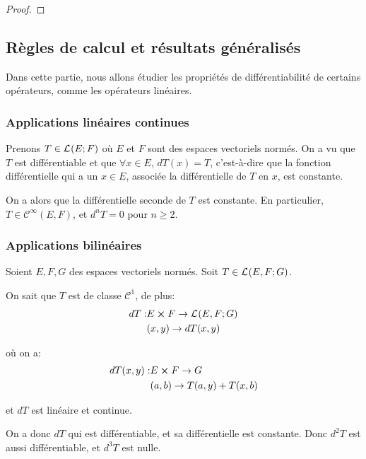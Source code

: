 \ifdefined\outputproof
\begin{proof}

\end{proof}
\fi

\subsection{Règles de calcul et résultats généralisés}

Dans cette partie, nous allons étudier les propriétés de différentiabilité de
certains opérateurs, comme les opérateurs linéaires.

\subsubsection{Applications linéaires continues}

Prenons $T \in \mathcal{L}_{}(E; F)$ où $E$ et $F$ sont des espaces vectoriels
normés.
On a vu que $T$ est différentiable et que $\forall x \in E$, $dT(x) = T$,
c'est-à-dire que la fonction différentielle qui a un $x \in E$, associée la
différentielle de $T$ en $x$, est constante.

On a alors que la différentielle seconde de $T$ est constante. En particulier,
$T \in \mathcal{C}^{\infty}(E, F)$, et $d^{n}T = 0$ pour $n \geq 2$.

\subsubsection{Applications bilinéaires}

Soient $E, F, G$ des espaces vectoriels normés.
Soit $T \in \mathcal{L}_{}(E, F; G)$.

On sait que $T$ est de classe $\mathcal{C}^{1}$, de plus:
\begin{align*}
	dT : & E \cross F \rightarrow \mathcal{L}_{}(E, F; G) \\
	& (x, y) \rightarrow dT(x, y)
\end{align*}

où on a:
\begin{align*}
	dT(x, y) : & E \cross F \rightarrow G \\
	& (a, b) \rightarrow T(a, y) + T(x, b)
\end{align*}

et $dT$ est linéaire et continue.

On a donc $dT$ qui est différentiable, et sa différentielle est constante.
Donc $d^{2}T$ est aussi différentiable, et $d^{3}T$ est nulle.

